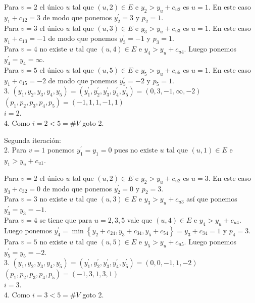 \documentclass[10pt]{article}
\begin{document}
Para $v=2$ el único $u$ tal que $(u, 2) \in E$ e $y_{2}>y_{u}+c_{u 2}$ es $u=1$. En este caso $y_{1}+c_{12}=3$ de modo que ponemos $y_{2}^{\prime}=3$ y $p_{2}=1$.\\
Para $v=3$ el único $u$ tal que $(u, 3) \in E$ e $y_{3}>y_{u}+c_{u 3}$ es $u=1$. En este caso $y_{1}+c_{13}=-1$ de modo que ponemos $y_{3}^{\prime}=-1$ y $p_{3}=1$.\\
Para $v=4$ no existe $u$ tal que $(u, 4) \in E$ e $y_{4}>y_{u}+c_{u 4}$. Luego ponemos $y_{4}^{\prime}=y_{4}=\infty$.\\
Para $v=5$ el único $u$ tal que $(u, 5) \in E$ e $y_{5}>y_{u}+c_{u 5}$ es $u=1$. En este caso $y_{1}+c_{15}=-2$ de modo que ponemos $y_{5}^{\prime}=-2$ y $p_{5}=1$.\\
3. $\left(y_{1}, y_{2}, y_{3}, y_{4}, y_{5}\right)=\left(y_{1}^{\prime}, y_{2}^{\prime}, y_{3}^{\prime}, y_{4}^{\prime}, y_{5}^{\prime}\right)=(0,3,-1, \infty,-2)$\\
$\left(p_{1}, p_{2}, p_{3}, p_{4}, p_{5}\right)=(-1,1,1,-1,1)$\\
$i=2$.\\
4. Como $i=2<5=\# V$ goto 2.

Segunda iteración:\\
2. Para $v=1$ ponemos $y_{1}^{\prime}=y_{1}=0$ pues no existe $u$ tal que $(u, 1) \in E$ e $y_{1}>y_{u}+c_{u 1}$.

Para $v=2$ el único $u$ tal que $(u, 2) \in E$ e $y_{2}>y_{u}+c_{u 2}$ es $u=3$. En este caso $y_{3}+c_{32}=0$ de modo que ponemos $y_{2}^{\prime}=0$ y $p_{2}=3$.\\
Para $v=3$ no existe $u$ tal que $(u, 3) \in E$ e $y_{3}>y_{u}+c_{u 3}$ así que ponemos $y_{3}^{\prime}=y_{3}=-1$.\\
Para $v=4$ se tiene que para $u=2,3,5$ vale que $(u, 4) \in E$ e $y_{4}>y_{u}+c_{u 4}$.\\
Luego ponemos $y_{4}^{\prime}=\min \left\{y_{2}+c_{24}, y_{3}+c_{34}, y_{5}+c_{54}\right\}=y_{3}+c_{34}=1$ y $p_{4}=3$.\\
Para $v=5$ no existe $u$ tal que $(u, 5) \in E$ e $y_{5}>y_{u}+c_{u 5}$. Luego ponemos $y_{5}^{\prime}=y_{5}=-2$.\\
3. $\left(y_{1}, y_{2}, y_{3}, y_{4}, y_{5}\right)=\left(y_{1}^{\prime}, y_{2}^{\prime}, y_{3}^{\prime}, y_{4}^{\prime}, y_{5}^{\prime}\right)=(0,0,-1,1,-2)$\\
$\left(p_{1}, p_{2}, p_{3}, p_{4}, p_{5}\right)=(-1,3,1,3,1)$\\
$i=3$.\\
4. Como $i=3<5=\# V$ goto 2.
\end{document}
